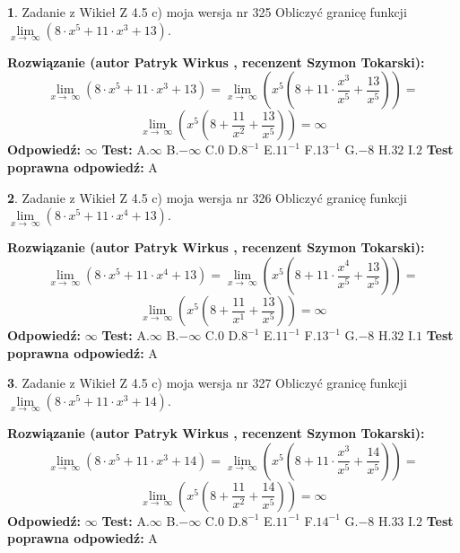 \documentclass[12pt, a4paper]{article}
\theoremstyle{definition} %
\newtheorem{zad}{}
\newcommand{\zadStart}[1]{\begin{zad}#1\newline}
\newcommand{\zadStop}{\end{zad}}
\newcommand{\rozwStart}[2]{\noindent \textbf{Rozwiązanie (autor #1 , recenzent #2): }\newline}
\newcommand{\rozwStop}{\newline}
\newcommand{\odpStart}{\noindent \textbf{Odpowiedź:}\newline}
\newcommand{\odpStop}{\newline}
\newcommand{\testStart}{\noindent \textbf{Test:}\newline}
\newcommand{\testStop}{\newline}
\newcommand{\kluczStart}{\noindent \textbf{Test poprawna odpowiedź:}\newline}
\newcommand{\kluczStop}{\newline}
\begin{document}
\zadStart{Zadanie z Wikieł Z 4.5 c) moja wersja nr 325}
Obliczyć granicę funkcji  $\lim\limits_{x\to\ \infty}(8 \cdot x^{5}+11 \cdot x^{3}+13)$.
\zadStop
\rozwStart{Patryk Wirkus}{Szymon Tokarski}
$$\lim\limits_{x\to\ \infty}(8 \cdot x^{5}+11 \cdot x^{3}+13) = \lim\limits_{x\to\ \infty}(x^{5}(8 +11 \cdot \frac{x^{3}}{x^{5}}+\frac{13}{x^{5}})) =$$ $$\lim\limits_{x\to\ \infty}(x^{5}(8 +\frac{11}{x^{2}}+\frac{13}{x^{5}})) =\infty$$
\rozwStop
\odpStart
$\infty$
\odpStop
\testStart
A.$\infty$ B.$-\infty$ C.$0$ D.$8^{-1}$ E.$11^{-1}$
F.$13^{-1}$ G.$-8$
H.$32$
I.$2$
\testStop
\kluczStart
A
\kluczStop



\zadStart{Zadanie z Wikieł Z 4.5 c) moja wersja nr 326}
Obliczyć granicę funkcji  $\lim\limits_{x\to\ \infty}(8 \cdot x^{5}+11 \cdot x^{4}+13)$.
\zadStop
\rozwStart{Patryk Wirkus}{Szymon Tokarski}
$$\lim\limits_{x\to\ \infty}(8 \cdot x^{5}+11 \cdot x^{4}+13) = \lim\limits_{x\to\ \infty}(x^{5}(8 +11 \cdot \frac{x^{4}}{x^{5}}+\frac{13}{x^{5}})) =$$ $$\lim\limits_{x\to\ \infty}(x^{5}(8 +\frac{11}{x^{1}}+\frac{13}{x^{5}})) =\infty$$
\rozwStop
\odpStart
$\infty$
\odpStop
\testStart
A.$\infty$ B.$-\infty$ C.$0$ D.$8^{-1}$ E.$11^{-1}$
F.$13^{-1}$ G.$-8$
H.$32$
I.$1$
\testStop
\kluczStart
A
\kluczStop



\zadStart{Zadanie z Wikieł Z 4.5 c) moja wersja nr 327}
Obliczyć granicę funkcji  $\lim\limits_{x\to\ \infty}(8 \cdot x^{5}+11 \cdot x^{3}+14)$.
\zadStop
\rozwStart{Patryk Wirkus}{Szymon Tokarski}
$$\lim\limits_{x\to\ \infty}(8 \cdot x^{5}+11 \cdot x^{3}+14) = \lim\limits_{x\to\ \infty}(x^{5}(8 +11 \cdot \frac{x^{3}}{x^{5}}+\frac{14}{x^{5}})) =$$ $$\lim\limits_{x\to\ \infty}(x^{5}(8 +\frac{11}{x^{2}}+\frac{14}{x^{5}})) =\infty$$
\rozwStop
\odpStart
$\infty$
\odpStop
\testStart
A.$\infty$ B.$-\infty$ C.$0$ D.$8^{-1}$ E.$11^{-1}$
F.$14^{-1}$ G.$-8$
H.$33$
I.$2$
\testStop
\kluczStart
A
\kluczStop
\end{document}
